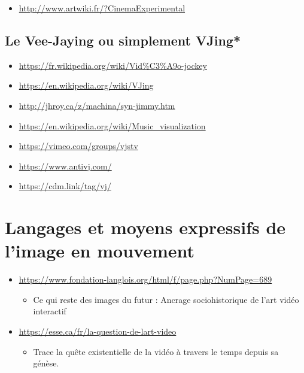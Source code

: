 \documentclass[
  french,
]{book}
\providecommand{\tightlist}{%
  \setlength{\itemsep}{0pt}\setlength{\parskip}{0pt}}
\begin{document}
\begin{itemize}
\tightlist
\item
  \url{http://www.artwiki.fr/?CinemaExperimental}
\end{itemize}

\hypertarget{le-vee-jaying-ou-simplement-vjing}{%
\subsection{\texorpdfstring{Le \textbf{Vee-Jaying} ou simplement \textbf{VJing}*}{Le Vee-Jaying ou simplement VJing*}}\label{le-vee-jaying-ou-simplement-vjing}}

\begin{itemize}
\tightlist
\item
  \url{https://fr.wikipedia.org/wiki/Vid\%C3\%A9o-jockey}
\item
  \url{https://en.wikipedia.org/wiki/VJing}
\item
  \url{http://jhroy.ca/z/machina/syn-jimmy.htm}
\item
  \url{https://en.wikipedia.org/wiki/Music_visualization}
\item
  \url{https://vimeo.com/groups/vjstv}
\item
  \url{https://www.antivj.com/}
\item
  \url{https://cdm.link/tag/vj/}
\end{itemize}

\hypertarget{evolution_historique_language}{%
\section{Langages et moyens expressifs de l'image en mouvement}\label{evolution_historique_language}}

\begin{itemize}
\tightlist
\item
  \url{https://www.fondation-langlois.org/html/f/page.php?NumPage=689}

  \begin{itemize}
  \tightlist
  \item
    Ce qui reste des images du futur : Ancrage sociohistorique de l'art vidéo interactif\\
  \end{itemize}
\item
  \url{https://esse.ca/fr/la-question-de-lart-video}

  \begin{itemize}
  \tightlist
  \item
    Trace la quête existentielle de la vidéo à travers le temps depuis sa génèse.
  \end{itemize}
\end{itemize}
\end{document}
